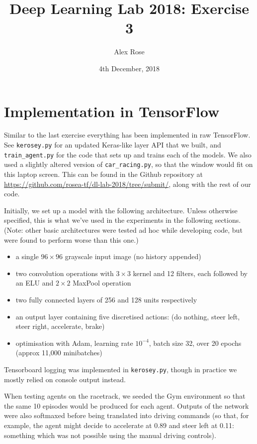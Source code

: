 \documentclass[11pt]{article} %
\title{Deep Learning Lab 2018: Exercise 3}
\author{Alex Rose}
\date{4th December, 2018} %
\begin{document}
\maketitle

\section{Implementation in TensorFlow}

Similar to the last exercise everything has been implemented in raw TensorFlow. See \texttt{kerosey.py} for an updated Keras-like layer API that we built, and \texttt{train\_agent.py} for the code that sets up and trains each of the models. We also used a slightly altered version of \texttt{car\_racing.py}, so that the window would fit on this laptop screen. This can be found in the Github repository at \url{https://github.com/rosea-tf/dl-lab-2018/tree/submit/}, along with the rest of our code.

Initially, we set up a model with the following architecture. Unless otherwise specified, this is what we've used in the experiments in the following sections. (Note: other basic architectures were tested ad hoc while developing code, but were found to perform worse than this one.) 

\begin{itemize}
	\item a single $96 \times 96$ grayscale input image (no history appended)
	\item two convolution operations with $3 \times 3$ kernel and 12 filters, each followed by an ELU and $2 \times 2$ MaxPool operation
	\item two fully connected layers of 256 and 128 units respectively
	\item an output layer containing five discretised actions: (do nothing, steer left, steer right, accelerate, brake)
	\item optimisation with Adam, learning rate $10^{-4}$, batch size 32, over 20 epochs (approx 11,000 minibatches)
	
\end{itemize}

Tensorboard logging was implemented in \texttt{kerosey.py}, though in practice we mostly relied on console output instead.

When testing agents on the racetrack, we seeded the Gym environment so that the same 10 episodes would be produced for each agent. Outputs of the network were also softmaxed before being translated into driving commands (so that, for example, the agent might decide to accelerate at 0.89 and steer left at 0.11: something which was not possible using the manual driving controls).
\end{document}
